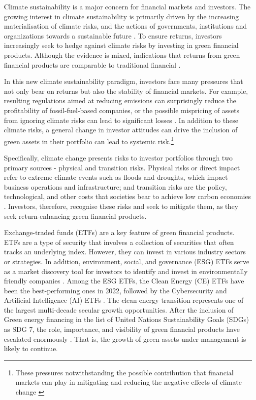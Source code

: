 \documentclass[
  letterpaper,
  DIV=11,
  numbers=noendperiod]{scrartcl}
\begin{document}
Climate sustainability is a major concern for financial markets and
investors. The growing interest in climate sustainability is primarily
driven by the increasing materialisation of climate risks, and the
actions of governments, institutions and organizations towards a
sustainable future \citep{giglio2021a}. To ensure returns, investors
increasingly seek to hedge against climate risks by investing in green
financial products. Although the evidence is mixed, indications that
returns from green financial products are comparable to traditional
financial \citetext{\citealp[see amongst
others,][]{decclesia2024}; \citealp{nguyen2025}; \citealp{pastor2022}; \citealp[and][]{naqvi2022}}.

In this new climate sustainability paradigm, investors face many
pressures that not only bear on returns but also the stability of
financial markets. For example, resulting regulations aimed at reducing
emissions can surprisingly reduce the profitability of fossil-fuel-based
companies, or the possible mispricing of assets from ignoring climate
risks can lead to significant losses \citep{nguyen2025}. In addition to
these climate risks, a general change in investor attitudes can drive
the inclusion of green assets in their portfolio can lead to systemic
risk.\footnote{These pressures notwithstanding the possible contribution
  that financial markets can play in mitigating and reducing the
  negative effects of climate change \citep{giglio2021a}}

Specifically, climate change presents risks to investor portfolios
through two primary sources - physical and transition risks. Physical
risks or direct impact refer to extreme climate events such as floods
and droughts, which impact business operations and infrastructure; and
transition risks are the policy, technological, and other costs that
societies bear to achieve low carbon economies
\citetext{\citealp{nguyen2025}; \citealp[and][ amongst
others]{giglio2021a}}. Investors, therefore, recognise these risks and
seek to mitigate them, as they seek return-enhancing green financial
products.

Exchange-traded funds (ETFs) are a key feature of green financial
products. ETFs are a type of security that involves a collection of
securities that often tracks an underlying index. However, they can
invest in various industry sectors or strategies. In addition,
environment, social, and governance (ESG) ETFs serve as a market
discovery tool for investors to identify and invest in environmentally
friendly companies \citep{briere2023}. Among the ESG ETFs, the Clean
Energy (CE) ETFs have been the best-performing ones in 2022, followed by
the Cybersecurity and Artificial Intelligence (AI) ETFs
\citep{decclesia2024}. The clean energy transition represents one of the
largest multi-decade secular growth opportunities. After the inclusion
of Green energy financing in the list of United Nations Sustainability
Goals (SDGs) as SDG 7, the role, importance, and visibility of green
financial products have escalated enormously \citep{naqvi2022}. That is,
the growth of green assets under management is likely to continue.
\end{document}
